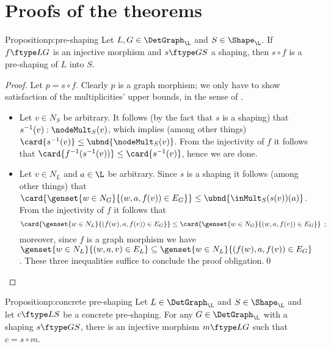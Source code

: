 \clearpage
\section{Proofs of the theorems}

\begin{oldresult}{Proposition}{p:pre-shaping}
  Let $L,G\in \DetGraph_\L$ and $S\in \Shape_\L$. If $f\ftype L G$ is an
  injective morphism and $s\ftype G S$ a shaping, then $s\circ f$ is a
  pre-shaping of $L$ into $S$.
\end{oldresult}
%
\begin{proof}
  Let $p=s\circ f$.  Clearly $p$ is a graph morphism; we only have to show
  satisfaction of the multiplicities' upper bounds, in the sense of
  .
%
\begin{itemize}\smalltopsep
\item Let $v\in N_S$ be arbitrary. It follows (by the fact that $s$ is a
  shaping) that $s^{-1}(v):\nodeMult_S(v)$, which implies (among other things)
  $\card{s^{-1}(v)}\leq \ubnd{\nodeMult_S(v)}$. From the injectivity of $f$ it
  follows that $\card{f^{-1}(s^{-1}(v))} \leq \card{s^{-1}(v)}$, hence we are
  done.
  
\item Let $v\in N_L$ and $a\in \L$ be arbitrary. Since $s$ is a
  shaping it follows (among other things) that $\card{\genset{w\in
  N_G}{(w,a,f(v)) \in E_G}} \leq \ubnd{\inMult_S(s(v))(a)}$. From the
  injectivity of $f$ it follows that 
  \[ \card{\genset{w\in N_L}{(f(w),a,f(v)) \in E_G}} \leq
     \card{\genset{w\in N_G}{(w,a,f(v)) \in E_G}} \enspace;
  \]
  moreover, since $f$ is a graph morphism we have $\genset{w\in N_L}{(w,a,v)
  \in E_L} \subseteq \genset{w\in N_L}{(f(w),a,f(v)) \in E_G}$. These three
  inequalities suffice to conclude the proof obligation.\qed
\end{itemize}
\end{proof}
%
\begin{oldresult}{Proposition}{p:concrete pre-shaping}
  Let $L\in \DetGraph_\L$ and $S\in \Shape_\L$ and let $c\ftype L S$ be a
  concrete pre-shaping. For any $G\in \DetGraph_\L$ with a shaping $s\ftype G
  S$, there is an injective morphism $m\ftype L G$ such that $c=s\circ m$.
\end{oldresult}
%
